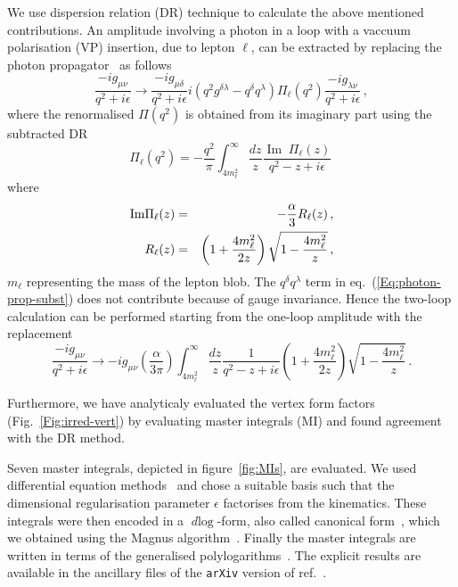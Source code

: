 \documentclass[Physsubmission, Phys]{SciPost}
\DeclareMathOperator{\dlog}{\mathit{d}log}
\begin{document}
We use dispersion relation (DR) technique to calculate the above mentioned contributions. An
amplitude involving a photon in a loop with a vaccuum polarisation (VP) insertion, due to
lepton $\ell$, can be extracted by replacing the photon propagator~\cite{Hoang:1995ex,Actis:2007fs,Actis:2008sk,Kuhn:2008zs,Barbieri:1972as,Barbieri:1972hn} as
follows
\begin{equation}
  \frac{-i g_{\mu \nu}}{q^2 + i \epsilon} \to
  \frac{-i g_{\mu \delta}}{q^2 + i \epsilon}
  i\left(q^2 g^{\delta \lambda} - q^\delta q^\lambda \right)
  \Pi_\ell(q^2)\frac{-i g_{\lambda \nu}}{q^2 + i \epsilon}\, ,
  \label{Eq:photon-prop-subst}
\end{equation}
where the renormalised $\Pi(q^2)$ is obtained
from its imaginary part using the subtracted DR
\begin{equation}
  \Pi_\ell(q^2)= -\frac{q^2}{\pi}\int_{4 m_\ell^2}^{\infty} \frac{dz}{z}
  \frac{\operatorname{Im}\;\Pi_\ell(z)}{q^2 - z + i \epsilon}\,
  \label{Eq:subtrDR}
\end{equation}
where
\begin{eqnarray}
  \text{Im}\Pi_\ell(z) &=& - \frac{\alpha}{3} R_\ell(z) \, , \\
  R_\ell(z) &=& \left( 1 + \frac{4 m_\ell^2}{2 z}\right)
  \sqrt{1 - \frac{4 m_\ell^2}{z}} 
  \label{{Eq:leptonic-Pi}}\, ,
\end{eqnarray}
$m_\ell$ representing the mass of the lepton blob.
The $q^\delta q^\lambda$ term in eq.~(\ref{Eq:photon-prop-subst})
does not contribute because of gauge invariance. Hence the two-loop
calculation can be performed starting from the one-loop
amplitude with the replacement
\begin{equation}
  \frac{-i g_{\mu \nu}}{q^2 + i \epsilon} \to - i g_{\mu \nu} \left(
  \frac{\alpha}{3 \pi} \right) \int_{4 m_\ell^2}^\infty \frac{dz}{z}
  \frac{1}{q^2 - z + i \epsilon}\left( 1 + \frac{4 m_\ell^2}{2 z}\right)
  \sqrt{1 - \frac{4 m_\ell^2}{z}}\, .
  \label{Eq:leptonic-subtrDR}
\end{equation}

Furthermore, we have analyticaly evaluated the vertex form factors (Fig.~\ref{Fig:irred-vert}) by evaluating master integrals (MI) and found agreement with the DR method.

Seven master integrals, depicted in figure~\ref{fig:MIs}, are evaluated. We used differential equation
methods~\cite{Kotikov:1990kg,Remiddi:1997ny,Gehrmann:1999as} and chose
a suitable basis such that the dimensional
regularisation parameter $\epsilon$ factorises from the kinematics. These
integrals were then encoded in a $\dlog$-form, also called canonical
form~\cite{Henn:2013pwa}, which we obtained using the
Magnus algorithm~\cite{DiVita:2014pza,Argeri:2014qva}. 
Finally the master integrals are written in terms of the generalised
polylogarithms~\cite{Remiddi:1999ew,Gehrmann:2001jv,Vollinga:2004sn}. The explicit results are available in the ancillary files of the \texttt{arXiv}
version of ref.~\cite{Budassi:2021twh}.
\end{document}
